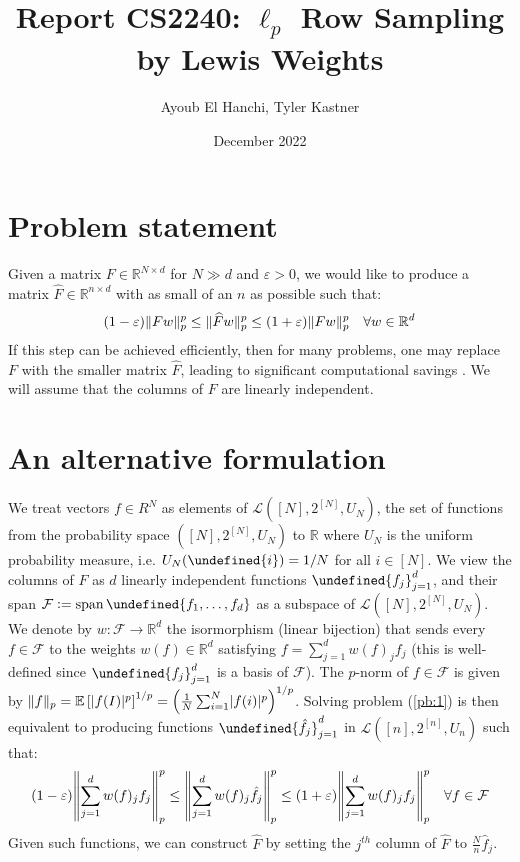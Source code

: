 \documentclass{article}
\title{Report CS2240: $\ell_p$ Row Sampling by Lewis Weights}
\author{Ayoub El Hanchi, Tyler Kastner}
\date{December 2022}
\theoremstyle{plain}
\theoremstyle{definition}
\theoremstyle{remark}
\newcommand{\defeq}{\vcentcolon=}
\let\brace\undefined
\DeclarePairedDelimiter{\brace}{\lbrace}{\rbrace}
\DeclarePairedDelimiter{\paren}{\lparen}{\rparen}
\newcommand{\eps}{\varepsilon}
\newcommand{\R}{\mathbb{R}}
\DeclarePairedDelimiter{\abs}{\lvert}{\rvert}
\DeclarePairedDelimiter{\norm}{\lVert}{\rVert}
\DeclareMathOperator{\spann}{span}
\newcommand{\E}[1]{\mathbb{E}\left[#1\right]}
\begin{document}
\maketitle

\section{Problem statement}
Given a matrix $F \in \R^{N \times d}$ for $N \gg d$ and $\eps > 0$, we would like to produce a matrix $\widehat{F} \in \R^{n \times d}$ with as small of an $n$ as possible such that:
\begin{equation}
\label{pb:1}
    (1 - \eps) \norm{Fw}_p^p \leq \norm{\widehat{F}w}_p^p \leq (1 + \eps) \norm{Fw}_p^p \quad \forall w \in \R^{d}
\end{equation}
If this step can be achieved efficiently, then for many problems, one may replace $F$ with the smaller matrix $\widehat{F}$, leading to significant computational savings . We will assume that the columns of $F$ are linearly independent. 

\section{An alternative formulation}
We treat vectors $f \in R^{N}$ as elements of $\mathcal{L}([N], 2^{[N]}, U_N)$, the set of functions from the probability space $([N], 2^{[N]}, U_N)$ to $\R$ where $U_N$ is the uniform probability measure, i.e. $U_N(\brace{i}) = 1/N$ for all $i \in [N]$. We view the columns of $F$ as $d$ linearly independent functions $\brace{f_j}_{j=1}^{d}$, and their span $\mathcal{F} \defeq \spann{\brace{f_1, \dotsc, f_d}}$ as a subspace of $\mathcal{L}([N], 2^{[N]}, U_N)$. We denote by $w: \mathcal{F} \to \R^{d}$ the isormorphism (linear bijection) that sends every $f \in \mathcal{F}$ to the weights $w(f) \in \R^{d}$ satisfying $f = \sum_{j=1}^{d} w(f)_j f_j$ (this is well-defined since $\brace{f_j}_{j=1}^{d}$ is a basis of $\mathcal{F}$). 
The $p$-norm of $f \in \mathcal{F}$ is given by $\norm{f}_p = \E{\abs{f(I)}^p}^{1/p} = \paren*{\frac{1}{N} \sum_{i=1}^{N} \abs{f(i)}^p}^{1/p}$. Solving problem (\ref{pb:1}) is then equivalent to producing functions $\brace{\hat{f}_j}_{j=1}^{d}$ in $\mathcal{L}([n], 2^{[n]}, U_n)$ such that:
\begin{equation}
\label{pb:2}
    (1 - \eps) \norm*{\sum_{j=1}^{d} w(f)_j f_j}_p^p \leq \norm*{\sum_{j=1}^{d} w(f)_j \hat{f}_j}_p^p \leq (1 + \eps) \norm*{\sum_{j=1}^{d} w(f)_j f_j}_p^p \quad \forall f \in \mathcal{F}
\end{equation}
Given such functions, we can construct $\widehat{F}$ by setting the $j^{th}$ column of $\widehat{F}$ to $\frac{N}{n}\hat{f}_j$.
\end{document}
